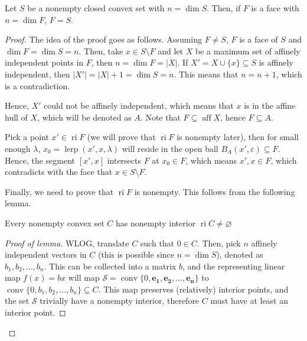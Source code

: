 \begin{theorem}
\label{thr:No proper faces with full dimensions}
  Let \( S \) be a nonempty closed convex set with \( n = \dim S
  \). Then, if \( F \) is a face with \( n = \dim F \), \( F = S
  \).
\end{theorem}

\begin{proof}
  The idea of the proof goes as follows.
  Assuming \( F \neq  S \), \( F \) is a face of \( S \) and \(
  \dim F = \operatorname{dim} S = n \). Then, take \( x \in S
  \setminus F \) and let \( X \) be a maximum set of affinely independent points
  in \( F \),
  then \( n = \dim F = |X| \).
  If \( X' = X \cup \{x\} \subseteq S   \) is affinely independent, then \( |X'|
  = |X| + 1 = \dim S = n \). This means that \( n = n + 1 \),
  which is a contradiction.

  Hence, \( X' \) could not be affinely independent, which means that \( x \) is
  in the affine hull of \( X \), which will be denoted as \( A \). Note that \(
  F \subseteq \operatorname{aff} X\), hence \( F \subseteq A \).

  Pick a point \( x' \in \operatorname{ri} F \) (we will prove that \(
  \operatorname{ri} F \) is nonempty later), then for small enough \( \lambda
  \), \( x_{0} = \operatorname{lerp}(x', x, \lambda) \) will reside in the open ball \(
  B_{A}(x', \varepsilon) \subseteq F\). Hence, the segment \( [x', x] \)
  intersects \( F \) at \( x_{0} \in F \), which means \( x', x \in F \), which
  contradicts with the face that \( x \in S \setminus F \).

  Finally, we need to prove that \( \operatorname{ri} F \) is nonempty. This
  follows from the following lemma.

  \begin{lemma}
  \label{lem:Nonempty convex set has nonempty interior}
    Every nonempty convex set \( C \) has nonempty interior \( \operatorname{ri}
    C \neq  \varnothing \)
  \end{lemma}

  \begin{proof}[Proof of lemma]
  WLOG, translate \( C \) such that \( 0 \in C \). Then, pick \( n \)
  affinely independent vectors in \( C \) (this is possible since \( n =
  \dim S \)), denoted as \( b_{1}, b_{2}, \ldots , b_{n} \). This
  can be collected into a matrix \( b \), and the representing linear map \(
  f(x) = bx \) will map \( \mathcal{S} = \operatorname{conv} \{0, \mathbf{e_{1}},
  \mathbf{e_{2}}, \ldots, \mathbf{e_{n}} \}   \) to \( \operatorname{conv} \{0,
  b_{1}, b_{2}, \ldots , b_{n}\} \subseteq C   \). This map preserves (relatively)
  interior points, and the set \( \mathcal{S} \) trivially have a nonempty interior,
  therefore \( C \) must have at least an interior point.
  \end{proof}
\end{proof}

